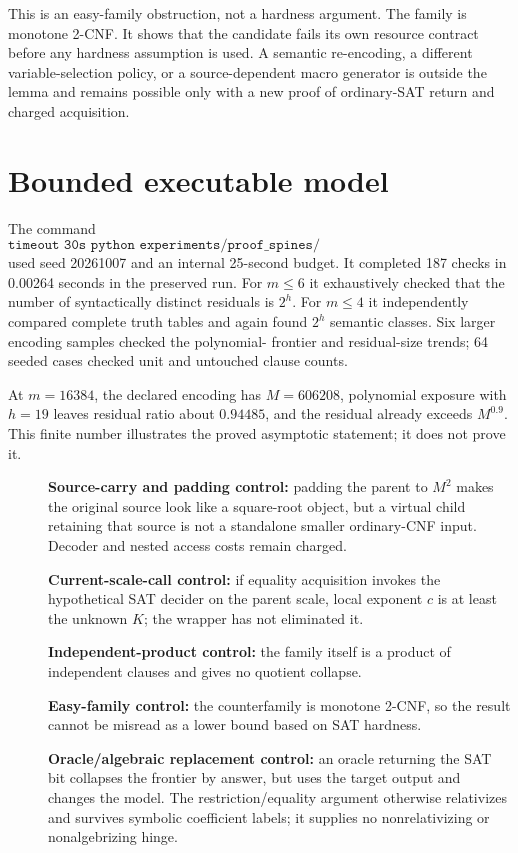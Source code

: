 \documentclass[11pt]{article}
\begin{document}
This is an easy-family obstruction, not a hardness argument.  The family is
monotone 2-CNF.  It shows that the candidate fails its own resource contract
before any hardness assumption is used.  A semantic re-encoding, a different
variable-selection policy, or a source-dependent macro generator is outside
the lemma and remains possible only with a new proof of ordinary-SAT return
and charged acquisition.

\section{Bounded executable model}
The command
\[
\texttt{timeout 30s python experiments/proof\_spines/
shannon\_quotient\_gate\_test.py}
\]
used seed 20261007 and an internal 25-second budget.  It completed 187 checks
in 0.00264 seconds in the preserved run.  For $m\le6$ it exhaustively checked
that the number of syntactically distinct residuals is $2^h$.  For $m\le4$
it independently compared complete truth tables and again found $2^h$
semantic classes.  Six larger encoding samples checked the polynomial-
frontier and residual-size trends; 64 seeded cases checked unit and untouched
clause counts.

At $m=16384$, the declared encoding has $M=606208$, polynomial exposure with
$h=19$ leaves residual ratio about $0.94485$, and the residual already exceeds
$M^{0.9}$.  This finite number illustrates the proved asymptotic statement;
it does not prove it.

\begin{description}
\item[] \textbf{Source-carry and padding control:} padding the parent to
$M^2$ makes the original source look like a square-root object, but a virtual
child retaining that source is not a standalone smaller ordinary-CNF input.
Decoder and nested access costs remain charged.
\item[] \textbf{Current-scale-call control:} if equality acquisition invokes
the hypothetical SAT decider on the parent scale, local exponent $c$ is at
least the unknown $K$; the wrapper has not eliminated it.
\item[] \textbf{Independent-product control:} the family itself is a product
of independent clauses and gives no quotient collapse.
\item[] \textbf{Easy-family control:} the counterfamily is monotone 2-CNF,
so the result cannot be misread as a lower bound based on SAT hardness.
\item[] \textbf{Oracle/algebraic replacement control:} an oracle returning
the SAT bit collapses the frontier by answer, but uses the target output and
changes the model.  The restriction/equality argument otherwise relativizes
and survives symbolic coefficient labels; it supplies no nonrelativizing or
nonalgebrizing hinge.
\end{description}
\end{document}

